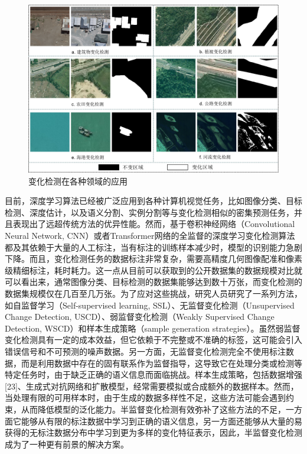 \documentclass[lang=chs, degree=master, blindreview=false, adobe=false]{yanputhesis}
\begin{document}
\begin{figure}[htb]
	\centering
	\includegraphics[scale=0.6]{images/fig1.png}
	\caption{
		变化检测在各种领域的应用
	}
	\label{fig:background}
\end{figure}

目前，深度学习算法已经被广泛应用到各种计算机视觉任务，比如图像分类、目标检测、深度估计，以及语义分割、实例分割等与变化检测相似的密集预测任务，并且表现出了远超传统方法的优异性能。然而，基于卷积神经网络（Convolutional Neural Network, CNN）或者Transformer网络的全监督的深度学习变化检测算法都及其依赖于大量的人工标注，当有标注的训练样本减少时，模型的识别能力急剧下降。而且，变化检测任务的数据标注非常复杂，需要高精度几何图像配准和像素级精细标注，耗时耗力。这一点从目前可以获取到的公开数据集的数据规模对比就可以看出来，通常图像分类、目标检测的数据集能够达到数十万张，而变化检测的数据集规模仅在几百至几万张。为了应对这些挑战，研究人员研究了一系列方法，如自监督学习（Self-supervised learning, SSL）、无监督变化检测（Unsupervised Change Detection, USCD）、弱监督变化检测（Weakly Supervised Change Detection, WSCD）和样本生成策略（sample generation strategies）。虽然弱监督变化检测具有一定的成本效益，但它依赖于不完整或不准确的标签，这可能会引入错误信号和不可预测的噪声数据。另一方面，无监督变化检测完全不使用标注数据，而是利用数据中存在的固有联系作为监督指导，这导致它在处理分类或检测等特定任务时，由于缺乏正确的语义信息而面临挑战。样本生成策略，包括数据增强[23]、生成式对抗网络和扩散模型，经常需要模拟或合成额外的数据样本。然而，当处理有限的可用样本时，由于生成的数据多样性不足，这些方法可能会遇到约束，从而降低模型的泛化能力。半监督变化检测有效弥补了这些方法的不足，一方面它能够从有限的标注数据中学习到正确的语义信息，另一方面还能够从大量的易获得的无标注数据分布中学习到更为多样的变化特征表示，因此，半监督变化检测成为了一种更有前景的解决方案。
\end{document}
